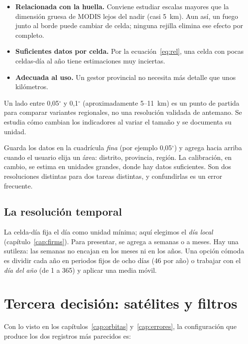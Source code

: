 \begin{itemize}
  \item \textbf{Relacionada con la huella.} Conviene estudiar escalas mayores que la
  dimensión gruesa de MODIS lejos del nadir (casi 5~km). Aun así, un fuego junto al borde
  puede cambiar de celda; ninguna rejilla elimina ese efecto por completo.
  \item \textbf{Suficientes datos por celda.} Por la ecuación~\eqref{eq:rel}, una celda con
  pocas celdas-día al año tiene estimaciones muy inciertas.
  \item \textbf{Adecuada al uso.} Un gestor provincial no necesita más detalle que unos
  kilómetros.
\end{itemize}

Un lado entre 0,05$^\circ$ y 0,1$^\circ$ (aproximadamente 5--11~km) es un punto de partida
para comparar variantes regionales, no una resolución validada de antemano. Se estudia
cómo cambian los indicadores al variar el tamaño y se documenta su unidad.

\begin{parareto}
Guarda los datos en la cuadrícula \emph{fina} (por ejemplo 0,05$^\circ$) y agrega hacia arriba
cuando el usuario elija un área: distrito, provincia, región. La calibración, en cambio, se
estima en unidades grandes, donde hay datos suficientes. Son dos resoluciones distintas para dos
tareas distintas, y confundirlas es un error frecuente.
\end{parareto}

\subsection{La resolución temporal}

La celda-día fija el día como unidad mínima; aquí elegimos el \emph{día local}
(capítulo~\ref{cap:firms}). Para presentar, se agrega a semanas o a meses. Hay una sutileza: las
semanas no encajan en los meses ni en los años. Una opción cómoda es dividir cada año en
periodos fijos de ocho días (46 por año) o trabajar con el \emph{día del año} (de 1 a 365) y
aplicar una media móvil.

\section{Tercera decisión: satélites y filtros}

Con lo visto en los capítulos~\ref{cap:orbitas} y~\ref{cap:errores}, la configuración que
produce los dos registros más parecidos es:

